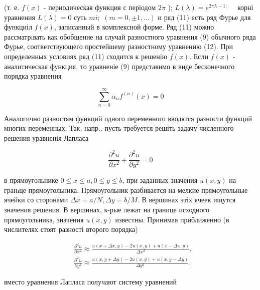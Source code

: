 \documentclass[10pt]{article}
\begin{document}
(т. е. $f(x)$ - периодическая функция с періодом $2 \pi$ ); $L(\lambda)=e^{2 \pi \lambda-1 ;} \quad$ корні уравнения $L(\lambda)=0$ суть $m i ;$ $(m=0, \pm 1, \ldots)$ и ряд (11) есть ряд Фурье для функциіл $f(x)$, записанный в комплексной форме. Ряд (11) можно рассматрıвать как обобщение на случай разностного уравнения (9) обычного ряда Фурье, соответствующего простейшему разностному уравнению (12). При определенных условиях ряд (11) сходится к решенію $f(x)$. Если $f(x)$ - аналитическая функция, то уравненіе (9) представимо в виде бесконечного порядка уравнения



\[

\sum_{n=0}^{\infty} \alpha_{n} f^{(n)}(x)=0

\]



Аналогично разностям функций одного переменного вводятся разности функций многих переменных. Так, напр., пусть требуется решіть задачу численного решения уравненія Лапласа



\[

\frac{\partial^{2} u}{\partial x^{2}}+\frac{\partial^{2} u}{\partial y^{2}}=0

\]



в прямоугольнике $0 \leqslant x \leqslant a, 0 \leqslant y \leqslant b$, при заданных значения $u(x, y)$ на гранıце прямоугольника. Прямоугольник разбивается на мелкие прямоугольные ячейки со сторонами $\Delta x=a / N, \Delta y=b / M$. В вершинах этіх ячеек ищутся значения решения. В вершинах, к-рые лежат на границе исходного прямоугольника, значения $u(x, y)$ известны. Принимая приближенно (в числителях стоят разності второго порядка)



\[

\begin{aligned}

& \frac{\partial^{2} u}{\partial x^{2}} \approx \frac{u(x+\Delta x, y)-2 u(x, y)+u(x-\Delta x, y)}{\Delta x^{2}}, \\

& \frac{\partial^{2} u}{\partial y^{2}} \approx \frac{u(x, y+\Delta y)-2 u(x, y)+u(x, y-\Delta y)}{\Delta y^{2}},

\end{aligned}

\]



вместо уравнения Лапласа получают систему уравнений
\end{document}
